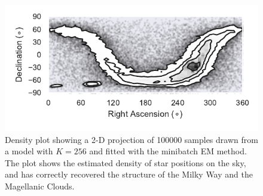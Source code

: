 \begin{figure}
  \centering
  \includegraphics{figures/density.pdf}
  \caption{Density plot showing a 2-D projection of 100000 samples drawn from a model with $K=256$ and fitted with the minibatch EM method.
  The plot shows the estimated density of star positions on the sky, and has correctly recovered the structure of the Milky Way and the Magellanic Clouds.}
  \label{fig:projection}
\end{figure}
